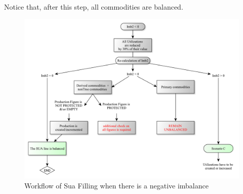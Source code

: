 \documentclass[]{article}
\begin{document}
Notice that, after this step, all commodities are balanced.

\begin{figure}

{\centering \includegraphics{images/StandBal/06b_NegativeImbalance} 

}

\caption{\label{fig:f5}Workflow of Sua Filling when there is a negative imbalance}\label{fig:f6}
\end{figure}
\end{document}
